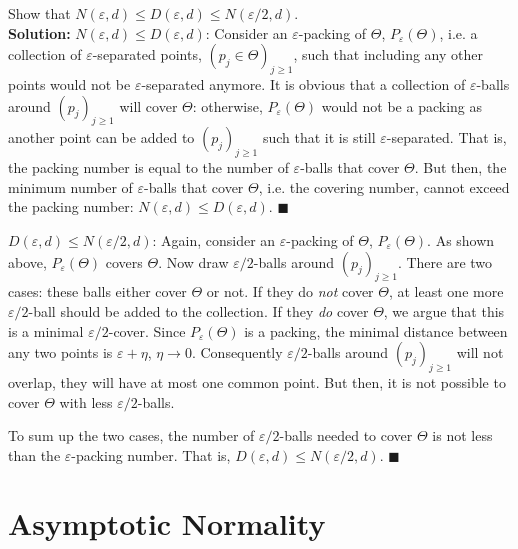 \documentclass[11pt,letterpaper]{article}                  %
\begin{document}
\bigskip
\begin{problem}
Show that $N (\varepsilon, d) \leq D(\varepsilon, d) \leq N(\varepsilon/2, d)$. \\

\textbf{Solution:}
$N (\varepsilon, d) \leq D(\varepsilon, d)$:
Consider an $\varepsilon$-packing of $\Theta$, $P_{\varepsilon}(\Theta)$, i.e. a collection of $\varepsilon$-separated points, $(p_j \in \Theta)_{j \geq 1}$, such that including any other points would not be $\varepsilon$-separated anymore.
It is obvious that a collection of $\varepsilon$-balls around $(p_j)_{j \geq 1}$ will cover $\Theta$: otherwise, $P_{\varepsilon}(\Theta)$ would not be a packing as another point can be added to $(p_j)_{j \geq 1}$ such that it is still $\varepsilon$-separated.
That is, the packing number is equal to the number of $\varepsilon$-balls that cover $\Theta$.
But then, the minimum number of $\varepsilon$-balls that cover $\Theta$, i.e. the covering number, cannot exceed the packing number: $N (\varepsilon, d) \leq D(\varepsilon, d)$.
\hfill $\blacksquare$

\medskip

$D (\varepsilon, d) \leq N(\varepsilon/2, d)$:
Again, consider an $\varepsilon$-packing of $\Theta$, $P_{\varepsilon}(\Theta)$.
As shown above, $P_{\varepsilon}(\Theta)$ covers $\Theta$.
Now draw $\varepsilon/2$-balls around $(p_j)_{j \geq 1}$.
There are two cases: these balls either cover $\Theta$ or not.
If they do \emph{not} cover $\Theta$, at least one more $\varepsilon/2$-ball should be added to the collection.
If they \emph{do} cover $\Theta$, we argue that this is a minimal $\varepsilon/2$-cover.
Since $P_{\varepsilon}(\Theta)$ is a packing, the minimal distance between any two points is $\varepsilon + \eta$, $\eta \to 0$.
Consequently $\varepsilon/2$-balls around $(p_j)_{j \geq 1}$ will not overlap, they will have at most one common point.
But then, it is not possible to cover $\Theta$ with less $\varepsilon/2$-balls.

To sum up the two cases, the number of $\varepsilon/2$-balls needed to cover $\Theta$ is not less than the $\varepsilon$-packing number.
That is, $D (\varepsilon, d) \leq N(\varepsilon/2, d)$.
\hfill $\blacksquare$

\end{problem}

\section{Asymptotic Normality}
\end{document}
